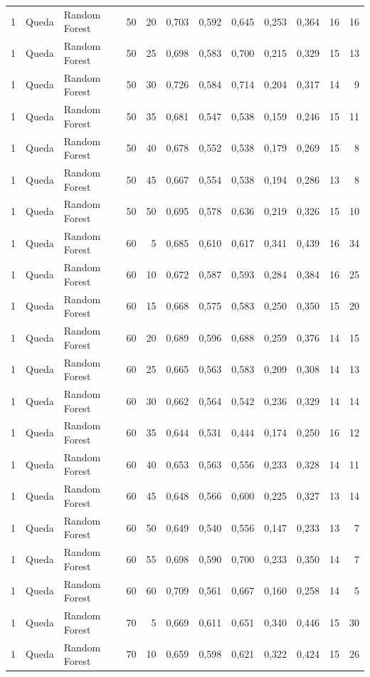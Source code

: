 \begin{longtable}{@{}rllrrrrrrrrr@{}}
1 & Queda & Random Forest & 50 & 20 & 0,703 & 0,592 & 0,645 & 0,253 & 0,364 & 16 & 16 \\
1 & Queda & Random Forest & 50 & 25 & 0,698 & 0,583 & 0,700 & 0,215 & 0,329 & 15 & 13 \\
1 & Queda & Random Forest & 50 & 30 & 0,726 & 0,584 & 0,714 & 0,204 & 0,317 & 14 & 9 \\
1 & Queda & Random Forest & 50 & 35 & 0,681 & 0,547 & 0,538 & 0,159 & 0,246 & 15 & 11 \\
1 & Queda & Random Forest & 50 & 40 & 0,678 & 0,552 & 0,538 & 0,179 & 0,269 & 15 & 8 \\
1 & Queda & Random Forest & 50 & 45 & 0,667 & 0,554 & 0,538 & 0,194 & 0,286 & 13 & 8 \\
1 & Queda & Random Forest & 50 & 50 & 0,695 & 0,578 & 0,636 & 0,219 & 0,326 & 15 & 10 \\
1 & Queda & Random Forest & 60 & 5 & 0,685 & 0,610 & 0,617 & 0,341 & 0,439 & 16 & 34 \\
1 & Queda & Random Forest & 60 & 10 & 0,672 & 0,587 & 0,593 & 0,284 & 0,384 & 16 & 25 \\
1 & Queda & Random Forest & 60 & 15 & 0,668 & 0,575 & 0,583 & 0,250 & 0,350 & 15 & 20 \\
1 & Queda & Random Forest & 60 & 20 & 0,689 & 0,596 & 0,688 & 0,259 & 0,376 & 14 & 15 \\
1 & Queda & Random Forest & 60 & 25 & 0,665 & 0,563 & 0,583 & 0,209 & 0,308 & 14 & 13 \\
1 & Queda & Random Forest & 60 & 30 & 0,662 & 0,564 & 0,542 & 0,236 & 0,329 & 14 & 14 \\
1 & Queda & Random Forest & 60 & 35 & 0,644 & 0,531 & 0,444 & 0,174 & 0,250 & 16 & 12 \\
1 & Queda & Random Forest & 60 & 40 & 0,653 & 0,563 & 0,556 & 0,233 & 0,328 & 14 & 11 \\
1 & Queda & Random Forest & 60 & 45 & 0,648 & 0,566 & 0,600 & 0,225 & 0,327 & 13 & 14 \\
1 & Queda & Random Forest & 60 & 50 & 0,649 & 0,540 & 0,556 & 0,147 & 0,233 & 13 & 7 \\
1 & Queda & Random Forest & 60 & 55 & 0,698 & 0,590 & 0,700 & 0,233 & 0,350 & 14 & 7 \\
1 & Queda & Random Forest & 60 & 60 & 0,709 & 0,561 & 0,667 & 0,160 & 0,258 & 14 & 5 \\
1 & Queda & Random Forest & 70 & 5 & 0,669 & 0,611 & 0,651 & 0,340 & 0,446 & 15 & 30 \\
1 & Queda & Random Forest & 70 & 10 & 0,659 & 0,598 & 0,621 & 0,322 & 0,424 & 15 & 26 \\

\end{longtable}
